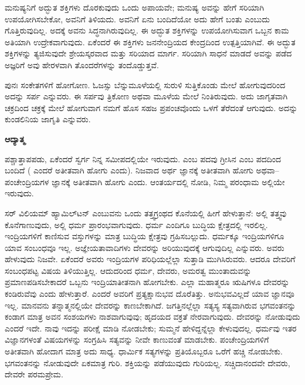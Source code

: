 ಮನುಷ್ಯನಿಗೆ ಅದ್ಭುತ ಶಕ್ತಿಗಳು ದೊರಕುವುದು ಒಂದು ಅಪಾಯವೇ; ಮನುಷ್ಯ ಅವನ್ನು ಹೇಗೆ ಸರಿಯಾಗಿ ಉಪಯೋಗಿಸಬೇಕೋ, ಅವನಿಗೆ ತಿಳಿಯದು. ಅವನಿಗೆ ಏನು ಬಂದಿದೆಯೋ ಅದು ಹೇಗೆ ಬಂತು ಎಂಬುದು ಗೊತ್ತಿರುವುದಿಲ್ಲ. ಅದಕ್ಕೆ ಅವನು ಸಿದ್ಧನಾಗಿರುವುದಿಲ್ಲ. ಈ ಅದ್ಭುತ ಶಕ್ತಿಗಳನ್ನು ಉಪಯೋಗಿಸುವಾಗ ಒಬ್ಬನ ಕಾಮ ಅತಿಯಾಗಿ ಉದ್ರೇಕವಾಗುವುದು. ಏಕೆಂದರೆ ಈ ಶಕ್ತಿಗಳು ಜನನೇಂದ್ರಿಯದ ಕೇಂದ್ರದಿಂದ ಉತ್ಪತ್ತಿಯಾಗಿವೆ. ಈ ಅದ್ಭುತ ಶಕ್ತಿಗಳನ್ನು ತ್ಯಜಿಸುವುದೇ ಶ್ರೇಯಸ್ಕರವಾದ ಮತ್ತು ಸರಿಯಾದ ಮಾರ್ಗ. ಸರಿಯಾಗಿ ಸಾಧನೆ ಮಾಡದೆ ಅವನ್ನು ಪಡೆದ ಅಜ್ಞರಿಗೆ ಅವು ಹೇರಳವಾಗಿ ತೊಂದರೆಗಳನ್ನು ತಂದೊಡ್ಡುತ್ತವೆ.

ಪುನಃ ಸಂಕೇತಗಳಿಗೆ ಹೋಗೋಣ. ಓಜಸ್ಸು ಬೆನ್ನುಮೂಳೆಯಲ್ಲಿ ಸುರುಳಿ ಸುತ್ತಿಕೊಂಡು ಮೇಲೆ ಹೋಗುವುದರಿಂದ ಅದನ್ನು ಸರ್ಪ ಎನ್ನುವರು. ಈ ಸರ್ಪವು ತ್ರಿಕೋಣ ಅಥವಾ ಮೂಳೆಯ ಮೇಲೆ ನಿಂತಿರುವುದು. ಅದು ಜಾಗೃತವಾಗಿ ಚಕ್ರದಿಂದ ಚಕ್ರಕ್ಕೆ ಮೇಲೆ ಹೋಗುವಾಗ ನಮಗೆ ಹೊಸ ಸಹಜ ಪ್ರಪಂಚವೊಂದು ಒಳಗೆ ತೆರೆದಂತೆ ಆಗುವುದು. ಅದನ್ನು ಕುಂಡಲಿನಿಯ ಜಾಗೃತಿ ಎನ್ನುವರು.

\vskip -0.6cm

\begin{center}
\textbf{ಆದ್ಯಾತ್ಮ}
\end{center}

\vskip -0.6cm

ಪಶ್ಚಾತ್ತಾಪಪಡು, ಏಕೆಂದರೆ ಸ್ವರ್ಗ ನಿನ್ನ ಸಮೀಪದಲ್ಲಿಯೇ ಇರುವುದು.  ಎಂಬ ಪದವು ಗ್ರೀಸಿನ  ಎಂಬ ಪದದಿಂದ ಬಂದಿದೆ ( ಎಂದರೆ ಅತೀತವಾಗಿ ಹೋಗು ಎಂದು). ನಿಜವಾದ ಅರ್ಥ ಜ್ಞಾನಕ್ಕೆ ಅತೀತವಾಗಿ ಹೋಗು ಅಥವಾ–ಪಂಚೇಂದ್ರಿಯಗಳ ಜ್ಞಾನಕ್ಕೆ ಅತೀತವಾಗಿ ಹೋಗು ಎಂದು. ಆಂತರ್ಯದಲ್ಲಿ ನೋಡಿ, ನಿಮ್ಮ ಪರಂಧಾಮ ಅಲ್ಲಿಯೇ ಇರುವುದು.

ಸರ್​ ವಿಲಿಯಮ್​ ಹ್ಯಾಮಿಲ್​ಟನ್​ ಎಂಬುವನು ಒಂದು ತತ್ತ್ವಗ್ರಂಥದ ಕೊನೆಯಲ್ಲಿ ಹೀಗೆ ಹೇಳುತ್ತಾನೆ: ಅಲ್ಲಿ ತತ್ತ್ವವು ಕೊನೆಗಾಣುವುದು, ಅಲ್ಲಿ ಧರ್ಮ ಪ್ರಾರಂಭವಾಗುವುದು. ಧರ್ಮ ಎಂದಿಗೂ ಬುದ್ಧಿಯ ಕ್ಷೇತ್ರದಲ್ಲಿ ಇರಲಿಲ್ಲ. ಇಂದ್ರಿಯಗಳಿಗೆ ಕಾಣಿಸುವ ವಸ್ತುಗಳನ್ನು ಮಾತ್ರ ಬುದ್ಧಿಯ ಕ್ಷೇತ್ರವು ಗ್ರಹಿಸಬಲ್ಲುದು. ಧರ್ಮಕ್ಕೂ ಇಂದ್ರಿಯಗಳಿಗೂ ಯಾವ ಸಂಬಂಧವೂ ಇಲ್ಲ. ಅಜ್ಞೇಯತಾವಾದಿಗಳು ದೇವರನ್ನು ಅರಿಯುವುದಕ್ಕೆ ಆಗುವುದಿಲ್ಲ ಎನ್ನುವರು. ಅವರು ಹೇಳುವುದು ನಿಜವೇ. ಏಕೆಂದರೆ ಅವರು ಇಂದ್ರಿಯಗಳ ಪರಿಧಿಯಲ್ಲೆಲ್ಲಾ ಸುತ್ತಾಡಿ ಮುಗಿಸಿರುವರು. ಆದರೂ ದೇವರಿಗೆ ಸಂಬಂಧಪಟ್ಟ ವಿಷಯ ತಿಳಿಯುತ್ತಿಲ್ಲ. ಆದುದರಿಂದ ಧರ್ಮ, ದೇವರು, ಅಮರತ್ವ ಮುಂತಾದುವನ್ನು ಪ್ರಮಾಣಪಡಿಸಬೇಕಾದರೆ ಒಬ್ಬನು ಇಂದ್ರಿಯಾತೀತನಾಗಿ ಹೋಗಬೇಕು. ಎಲ್ಲಾ ಮಹಾತ್ಮರೂ ಋಷಿಗಳೂ ದೇವರನ್ನು ಕಂಡಿರುವೆವು ಎಂದು ಹೇಳುತ್ತಾರೆ. ಎಂದರೆ ಅವರಿಗೆ ಪ್ರತ್ಯಕ್ಷಾನುಭವ ದೊರೆತಿತ್ತು. ಅನುಭವವಿಲ್ಲದೆ ಯಾವ ಜ್ಞಾನವೂ ಇಲ್ಲ. ಮಾನವನು ತನ್ನಾತ್ಮನಲ್ಲಿಯೇ ದೇವರನ್ನು ಕಾಣಬೇಕಾಗಿದೆ. ಜಗತ್ತಿನಲ್ಲೆಲ್ಲಾ ಸತ್ಯಸ್ಯ ಸತ್ಯವಾಗಿರುವ ಭಗವಂತನನ್ನು ಕಂಡಾಗ ಮಾತ್ರ ಅವನ ಸಂಶಯಗಳು ನಾಶವಾಗುವುವು; ಹೃದಯದ ವಕ್ರತೆ ನೇರವಾಗುವುದು. ದೇವರನ್ನು ನೋಡುವುದು ಎಂದರೆ ಇದೇ. ನಾವು ಇದನ್ನು ಪರೀಕ್ಷೆ ಮಾಡಿ ನೋಡಬೇಕು; ಸುಮ್ಮನೆ ಹೇಳಿದ್ದನ್ನೆಲ್ಲಾ ಕೇಳುವುದಲ್ಲ. ಧರ್ಮವು ಇತರ ವಿಜ್ಞಾನಗಳಂತೆ ವಿಷಯಗಳನ್ನು ಸಂಗ್ರಹಿಸಿ ಸತ್ಯವನ್ನು ನೀವೇ ಕಾಣುವಂತೆ ಮಾಡಬೇಕು. ಪಂಚೇಂದ್ರಿಯಗಳಿಗೆ ಅತೀತವಾಗಿ ಹೋದಾಗ ಮಾತ್ರ ಅದು ಸಾಧ್ಯ. ಧಾರ್ಮಿಕ ಸತ್ಯಗಳನ್ನು ಪ್ರತಿಯೊಬ್ಬರೂ ಒರೆಗೆ ಹಚ್ಚಿ ನೋಡಬೇಕು. ಭಗವಂತನನ್ನು ನೋಡುವುದೇ ಏಕಮಾತ್ರ ಗುರಿ. ಶಕ್ತಿಯನ್ನು ಪಡೆಯುವುದು ಗುರಿಯಲ್ಲ. ಸಚ್ಚಿದಾನಂದವೇ ದೇವರು, ದೇವರೇ ಪರಮಪ್ರೇಮ.


